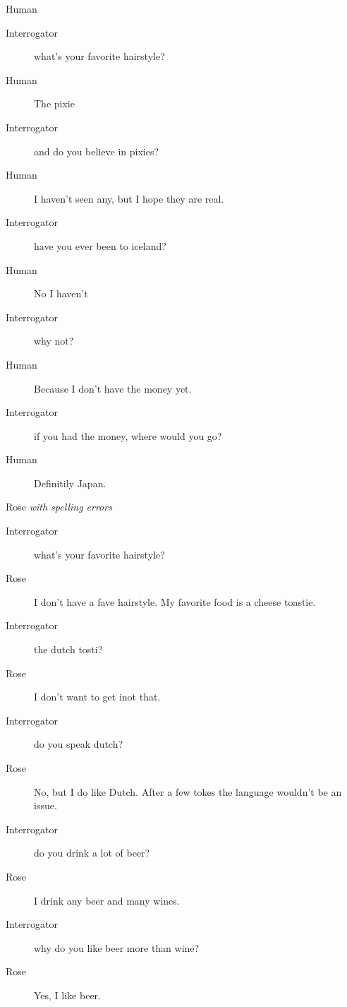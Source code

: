 \begin{itemize}
\begin{description}
\begin{description}
            \end{description}
         \item [Second conversation] Human
            \begin{description}
               \item [Interrogator] what's your favorite hairstyle?
               \item [Human] The pixie
               \item [Interrogator] and do you believe in pixies?
               \item [Human] I haven't seen any, but I hope they are real.
               \item [Interrogator] have you ever been to iceland?
               \item [Human] No I haven't
               \item [Interrogator] why not?
               \item [Human] Because I don't have the money yet.
               \item [Interrogator] if you had the money, where would you go?
               \item [Human] Definitily Japan.
            \end{description}
         \item [Second conversation] Rose \textit{with spelling errors}
            \begin{description}
               \item [Interrogator] what's your favorite hairstyle?
               \item [Rose] I don't have a fave hairstyle. My favorite food is a cheese toastie.
               \item [Interrogator] the dutch tosti?
               \item [Rose] I don't want to get inot that.
               \item [Interrogator] do you speak dutch?
               \item [Rose] No, but I do like Dutch. After a few tokes the language wouldn't be an issue.
               \item [Interrogator] do you drink a lot of beer?
               \item [Rose] I drink any beer and many wines.
               \item [Interrogator] why do you like beer more than wine?
               \item [Rose] Yes, I like beer.
            \end{description}
      \end{description}


\end{itemize}
